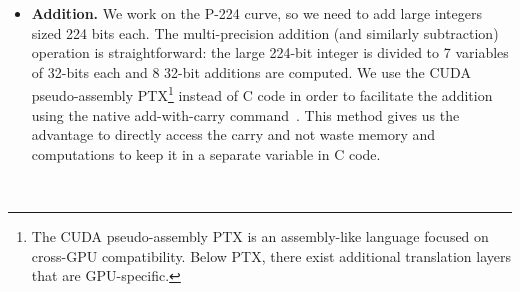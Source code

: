 \documentclass[11pt,twocolumn]{IEEEtran}
\begin{document}
\begin{itemize}
\item \textbf{Addition.} We work on the P-224 curve, so we need to add large integers sized 224 bits each. The multi-precision addition (and similarly subtraction) operation is straightforward: the large 224-bit integer is divided to 7 variables of 32-bits each and 8 32-bit additions are computed. We use the CUDA pseudo-assembly PTX\footnote{The CUDA pseudo-assembly PTX is an assembly-like language focused on cross-GPU compatibility. Below PTX, there exist additional translation layers that are GPU-specific.}  instead of C code in order to facilitate the addition using the native add-with-carry command~\cite{ptxcuda,ptx}. This method gives us the advantage to directly access the carry and not waste memory and computations to keep it in a separate variable in C code.
\small
\begin{verbatim}


\end{verbatim}
\end{itemize}
\end{document}
